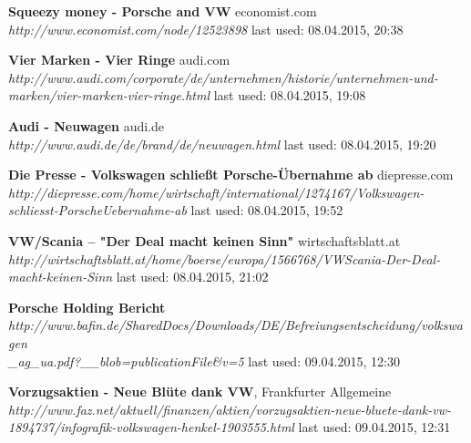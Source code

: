 \documentclass[12pt]{article}
\begin{document}
\begin{thebibliography}{56}
\textbf{Squeezy money - Porsche and VW} economist.com \\
\textit{http://www.economist.com/node/12523898}
\newline last used: 08.04.2015, 20:38

\textbf{Vier Marken - Vier Ringe} audi.com \\
\textit{http://www.audi.com/corporate/de/unternehmen/historie/unternehmen-und-marken/vier-marken-vier-ringe.html}
\newline last used: 08.04.2015, 19:08

\textbf{Audi - Neuwagen} audi.de \\
\textit{http://www.audi.de/de/brand/de/neuwagen.html}
\newline last used: 08.04.2015, 19:20

\textbf{Die Presse - Volkswagen schließt Porsche-Übernahme ab} diepresse.com \\
\textit{http://diepresse.com/home/wirtschaft/international/1274167/Volkswagen-schliesst-PorscheUebernahme-ab}
\newline last used: 08.04.2015, 19:52

\textbf{VW/Scania – "Der Deal macht keinen Sinn"} wirtschaftsblatt.at \\
\textit{http://wirtschaftsblatt.at/home/boerse/europa/1566768/VWScania-Der-Deal-macht-keinen-Sinn}
\newline last used: 08.04.2015, 21:02

\textbf{Porsche Holding Bericht} \\
\textit{http://www.bafin.de/SharedDocs/Downloads/DE/Befreiungsentscheidung/volkswagen\\\_ag\_ua.pdf?\_\_blob=publicationFile\&v=5
}
\newline last used: 09.04.2015, 12:30


\textbf{Vorzugsaktien - Neue Blüte dank VW}, Frankfurter Allgemeine \\
\textit{http://www.faz.net/aktuell/finanzen/aktien/vorzugsaktien-neue-bluete-dank-vw-1894737/infografik-volkswagen-henkel-1903555.html}
\newline last used: 09.04.2015, 12:31



\end{thebibliography}
\end{document}
